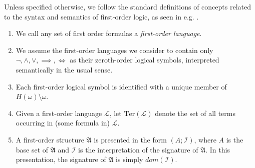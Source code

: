 \documentclass[12pt]{article}
\numberwithin{equation}{section}
\begin{document}
Unless specified otherwise, we follow the standard definitions of concepts related to the syntax and semantics of first-order logic, as seen in e.g. \cite{enderton}.

\begin{con}\label{firstconv}
\leavevmode
\begin{enumerate}[label=(\arabic*)]
    \item We call any set of first order formulas a \emph{first-order language}.
    \item We assume the first-order languages we consider to contain only $\neg, \wedge, \vee, \implies, \iff$ as their zeroth-order logical symbols, interpreted semantically in the usual sense. 
    \item Each first-order logical symbol is identified with a unique member of $H(\omega) \setminus \omega$.
    \item Given a first-order language $\mathcal{L}$, let $\mathrm{Ter}(\mathcal{L})$ denote the set of all terms occurring in (some formula in) $\mathcal{L}$.
    \item A first-order structure $\mathfrak{A}$ is presented in the form $(A; \mathcal{I})$, where $A$ is the base set of $\mathfrak{A}$ and $\mathcal{I}$ is the interpretation of the signature of $\mathfrak{A}$. In this presentation, the signature of $\mathfrak{A}$ is simply $dom(\mathcal{I})$. 
    

\end{enumerate}
\end{con}
\end{document}
